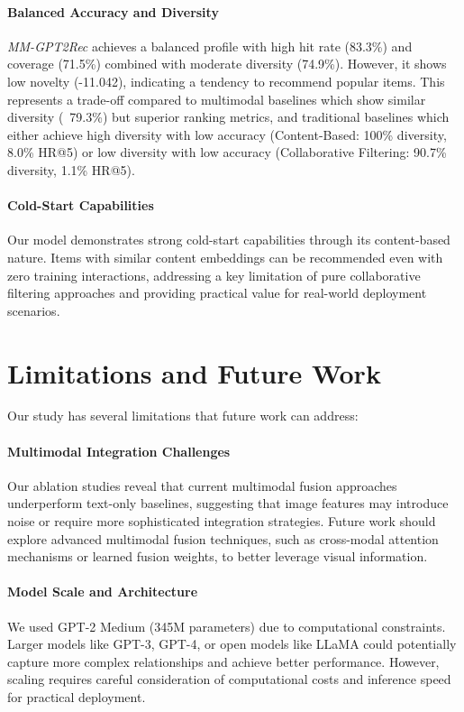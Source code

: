\documentclass[conference]{IEEEtran}
\begin{document}
\paragraph{Balanced Accuracy and Diversity} \textit{MM-GPT2Rec} achieves a balanced profile with high hit rate (83.3\%) and coverage (71.5\%) combined with moderate diversity (74.9\%). However, it shows low novelty (-11.042), indicating a tendency to recommend popular items. This represents a trade-off compared to multimodal baselines which show similar diversity (~79.3\%) but superior ranking metrics, and traditional baselines which either achieve high diversity with low accuracy (Content-Based: 100\% diversity, 8.0\% HR@5) or low diversity with low accuracy (Collaborative Filtering: 90.7\% diversity, 1.1\% HR@5).

\paragraph{Cold-Start Capabilities} Our model demonstrates strong cold-start capabilities through its content-based nature. Items with similar content embeddings can be recommended even with zero training interactions, addressing a key limitation of pure collaborative filtering approaches and providing practical value for real-world deployment scenarios.



\section{Limitations and Future Work}
Our study has several limitations that future work can address:

\paragraph{Multimodal Integration Challenges} Our ablation studies reveal that current multimodal fusion approaches underperform text-only baselines, suggesting that image features may introduce noise or require more sophisticated integration strategies. Future work should explore advanced multimodal fusion techniques, such as cross-modal attention mechanisms or learned fusion weights, to better leverage visual information.

\paragraph{Model Scale and Architecture} We used GPT-2 Medium (345M parameters) due to computational constraints. Larger models like GPT-3, GPT-4, or open models like LLaMA could potentially capture more complex relationships and achieve better performance. However, scaling requires careful consideration of computational costs and inference speed for practical deployment.
\end{document}

